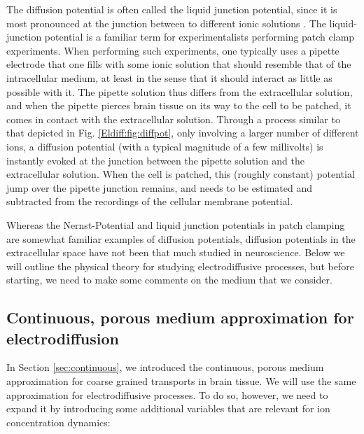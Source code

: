 The diffusion potential is often called the liquid junction potential, since it is most pronounced at the junction between to different ionic solutions \cite{Sokalski2001}. The liquid-junction potential is a familiar term for experimentalists performing patch clamp experiments. When performing such experiments, one typically uses a pipette electrode that one fills with some ionic solution that should resemble that of the intracellular medium, at least in the sense that it should interact as little as possible with it. The pipette solution thus differs from the extracellular solution, and when the pipette pierces brain tissue on its way to the cell to be patched, it comes in contact with the extracellular solution. Through a process similar to that depicted in Fig. \ref{Eldiff:fig:diffpot}, only involving a larger number of different ions, a diffusion potential (with a typical magnitude of a few millivolts) is instantly evoked at the junction between the pipette solution and the extracellular solution. When the cell is patched, this (roughly constant) potential jump over the pipette junction remains, and needs to be estimated and subtracted from the recordings of the cellular membrane potential.

Whereas the Nernst-Potential and liquid junction potentials in patch clamping are somewhat familiar examples of diffusion potentials, diffusion potentials in the extracellular space have not been that much studied in neuroscience. Below we will outline the physical theory for studying electrodiffusive processes, but before starting, we need to make some comments on the medium that we consider. 


\subsection{Continuous, porous medium approximation for electrodiffusion}
\label{sec:porous}
In Section \ref{sec:continuous}, we introduced the continuous, porous medium approximation for coarse grained transports in brain tissue. We will use the same approximation for electrodiffusive processes. To do so, however, we need to expand it by introducing some additional variables that are relevant for ion concentration dynamics:

